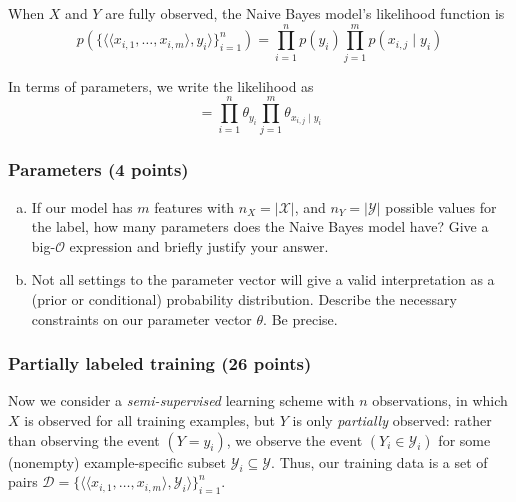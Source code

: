 \documentclass[11pt]{article}
\begin{document}
\noindent When $X$ and $Y$ are fully observed, the Naive Bayes model's likelihood
function is
\begin{equation}
  p( \{ \langle \langle x_{i,1}, \ldots, x_{i,m} \rangle, y_i \rangle \}_{i=1}^n )
  = \prod_{i=1}^n p(y_i) \prod_{j=1}^m p(x_{i,j} \mid y_i)\label{fully-observed}
\end{equation}

\noindent In terms of parameters, we write the likelihood as
$$
= \prod_{i=1}^n \theta_{y_i} \prod_{j=1}^m \theta_{x_{i,j} \mid y_i}
$$

\subsubsection{Parameters (4 points)}

\begin{enumerate}[(a)]

\item If our model has $m$ features with $n_X = |\mathcal{X}|$, and $n_Y =
|\mathcal{Y}|$ possible values for the label, how many parameters does the Naive
Bayes model have?  Give a big-$\mathcal{O}$ expression and briefly justify your
answer.

\begin{answertext}{2in}{}
\end{answertext}

\newpage
\item Not all settings to the parameter vector will give a valid interpretation
as a (prior or conditional) probability distribution.  Describe the necessary
constraints on our parameter vector $\theta$.  Be precise.

\begin{answertext}{2.5in}{}
  
\end{answertext}

\end{enumerate}


\subsubsection{Partially labeled training (26 points)}
Now we consider a \emph{semi-supervised} learning scheme with $n$ observations,
in which $X$ is observed for all training examples, but $Y$ is only
\emph{partially} observed: rather than observing the event $(Y = y_i)$, we
observe the event $(Y_i \in \mathcal{Y}_i)$ for some (nonempty) example-specific
subset $\mathcal{Y}_i \subseteq \mathcal{Y}$. Thus, our training data is a set
of pairs $\mathcal{D} = \{ \langle \langle x_{i,1}, \ldots, x_{i,m} \rangle,
\mathcal{Y}_i \rangle \}_{i=1}^n$.
\end{document}
